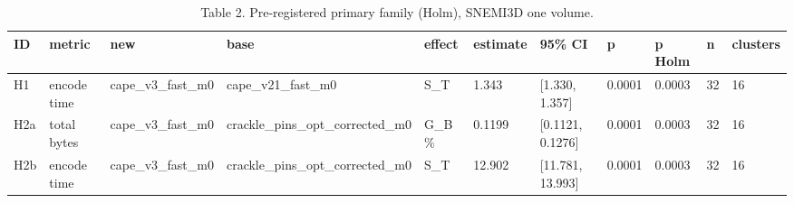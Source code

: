 \begin{table}[t]
\centering
\small
\caption{Table 2. Pre-registered primary family (Holm), SNEMI3D one volume.}
\begin{tabular}{lllllllllll}
\hline
ID & metric & new & base & effect & estimate & 95\% CI & p & p Holm & n & clusters \\
\hline
H1 & encode time & cape\_v3\_fast\_m0 & cape\_v21\_fast\_m0 & S\_T & 1.343 & [1.330, 1.357] & 0.0001 & 0.0003 & 32 & 16 \\
H2a & total bytes & cape\_v3\_fast\_m0 & crackle\_pins\_opt\_corrected\_m0 & G\_B \% & 0.1199 & [0.1121, 0.1276] & 0.0001 & 0.0003 & 32 & 16 \\
H2b & encode time & cape\_v3\_fast\_m0 & crackle\_pins\_opt\_corrected\_m0 & S\_T & 12.902 & [11.781, 13.993] & 0.0001 & 0.0003 & 32 & 16 \\
\hline
\end{tabular}
\end{table}
